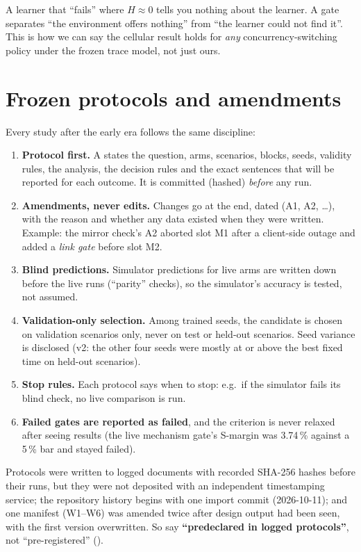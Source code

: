 \begin{keyidea}
A learner that ``fails'' where $H\approx0$ tells you nothing about the learner. A gate separates ``the environment offers nothing'' from ``the learner could not find it''. This is how we can say the cellular result holds for \emph{any} concurrency-switching policy under the frozen trace model, not just ours.
\end{keyidea}

\section{Frozen protocols and amendments}
Every study after the early era follows the same discipline:
\begin{enumerate}
\item \textbf{Protocol first.} A  states the question, arms, scenarios, blocks, seeds, validity rules, the analysis, the decision rules and the exact sentences that will be reported for each outcome. It is committed (hashed) \emph{before} any run.
\item \textbf{Amendments, never edits.} Changes go at the end, dated (A1, A2, \dots), with the reason and whether any data existed when they were written. Example: the mirror check's A2 aborted slot M1 after a client-side outage and added a \emph{link gate} before slot M2.
\item \textbf{Blind predictions.} Simulator predictions for live arms are written down before the live runs (``parity'' checks), so the simulator's accuracy is tested, not assumed.
\item \textbf{Validation-only selection.} Among trained seeds, the candidate is chosen on validation scenarios only, never on test or held-out scenarios. Seed variance is disclosed (v2: the other four seeds were mostly at or above the best fixed time on held-out scenarios).
\item \textbf{Stop rules.} Each protocol says when to stop: e.g.\ if the simulator fails its blind check, no live comparison is run.
\item \textbf{Failed gates are reported as failed}, and the criterion is never relaxed after seeing results (the live mechanism gate's S-margin was 3.74\,\% against a 5\,\% bar and stayed failed).
\end{enumerate}

\begin{careful}
Protocols were written to logged documents with recorded SHA-256 hashes before their runs, but they were not deposited with an independent timestamping service; the repository history begins with one import commit (2026-10-11); and one manifest (W1--W6) was amended twice after design output had been seen, with the first version overwritten. So say \textbf{``predeclared in logged protocols''}, not ``pre-registered'' ().
\end{careful}

